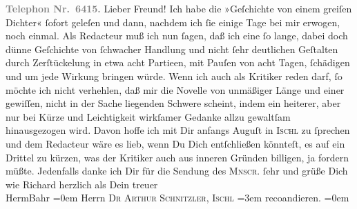 \begin{ledgroupsized}[t]{13cm}
           \textcolor{gray}{\textbf{Telephon Nr. 6415.}}\pend
           \pstart{}Lieber Freund!\pend\pstart
           Ich habe die »Geſchichte von einem greiſen
                  Dichter« ſofort geleſen und dann, nachdem ich ſie einige Tage bei mir
               erwogen, noch einmal. Als Redacteur muß ich nun ſagen, daß ich eine ſo lange, dabei
               doch dünne Geſchichte von ſchwacher Handlung und nicht ſehr deutlichen Geſtalten
               durch Zerſtückelung in etwa acht Partieen, mit Pauſen von acht Tagen, ſchädigen und
               um jede Wirkung bringen würde. Wenn ich auch als Kritiker reden darf, ſo möchte ich
               nicht verhehlen, daß mir die Novelle von unmäßiger Länge und {\pb}einer gewiſſen, nicht in der Sache liegenden
               Schwere scheint, indem ein heiterer, aber nur bei Kürze und Leichtigkeit wirkſamer
               Gedanke allzu gewaltſam hinausgezogen wird. Davon hoffe ich mit Dir anfangs Auguſt in
                  \textsc{Ischl} zu ſprechen und dem Redacteur wäre es lieb, wenn Du Dich entſchließen könnteſt,
               es auf ein Drittel zu kürzen, was der Kritiker auch aus inneren Gründen billigen, ja
               fordern müßte. Jedenfalls danke ich Dir für die Sendung des \textsc{Mnscr}. ſehr und grüße Dich wie Richard herzlich\pend
           \pstart
           als Dein treuer{\\[\baselineskip]}\spacefill\mbox{HermBahr}\pend
           \leftskip=0em{}\pstart
           \noindent{}Herrn \textsc{Dr Arthur Schnitzler, Ischl}\pend
           \leftskip=3em{}\pstart
           \noindent{}reco{\geminationm}andieren.\pend
           \leftskip=0em{}\pstart
           \textcolor{gray}{\textbf{\label{T_L00465_1v}\label{T_L00465_1h}}}\pend
           \endnumbering{}\end{ledgroupsized}  \newcommand{\dateiname}{L00465}\newcommand{\titel}{Hermann Bahr an Arthur Schnitzler, 23. 7. 1895}\newcommand{\editorInnen}{ Kurt Ifkovits,  Martin Anton Müller}
      